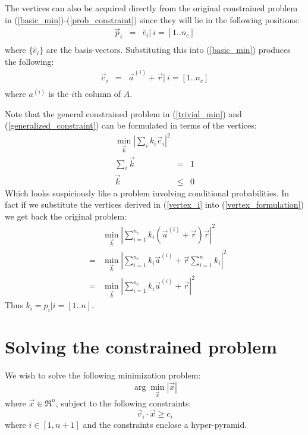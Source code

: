 \documentclass{article}
\begin{document}
The vertices can also be acquired directly from the original constrained
problem in (\ref{basic_min})-(\ref{prob_constraint})
since they will lie in the following positions:
\begin{eqnarray}
	\vec p_i & = & \hat e_i | ~ i=[1..n_c] \\
\end{eqnarray}
where $\lbrace \hat e_i \rbrace$ are the basis-vectors.
Substituting this into (\ref{basic_min}) produces the following:
\begin{eqnarray}
	\vec c_i & = & \vec a^{(i)} + \vec r | ~ i=[1..n_c] \label{vertex_i}\\
\end{eqnarray}
where $a^{(i)}$ is the $i$th column of $A$.

Note that the general constrained problem in (\ref{trivial_min}) 
and (\ref{generalized_constraint}) can be formulated in terms of the vertices:
\begin{eqnarray}
	\min_{\vec k} \left |\sum_i k_i \vec c_i \right |^2 & & \label{vertex_formulation}\\
	\sum_i \vec k & = & 1 \\
	\vec k & \le & 0
\end{eqnarray}
Which looks suspiciously like a problem involving conditional probabilities.
In fact if we substitute the vertices derived in (\ref{vertex_i} into 
(\ref{vertex_formulation}) we get back the original problem:
\begin{eqnarray}
	& & \min_{\vec k} \left |\sum_{i=1}^{n_c} k_i (\vec a^{(i)} + \vec r) \vec r \right |^2\\
	& = & \min_{\vec k} \left |\sum_{i=1}^{n_c} k_i \vec a^{(i)} + \vec r \sum_{i=1}^n k_i \right |^2\\
	& = & \min_{\vec k} \left |\sum_{i=1}^{n_c} k_i \vec a^{(i)} + \vec r \right |^2
\end{eqnarray}
Thus $k_i=p_i|i=[1..n]$.

\section{Solving the constrained problem}

We wish to solve the following minimization problem:
\begin{equation}
	\arg \min_{\vec x} |\vec x|
\end{equation}
where $\vec x \in \Re^n$, subject to the following constraints:
\begin{equation}
	\vec v_i \cdot \vec x \ge c_i
\end{equation}
where $i \in [1, n+1]$ and the constraints enclose a hyper-pyramid.
\end{document}
